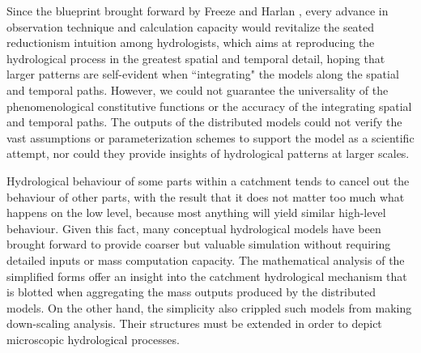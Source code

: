 \documentclass[11pt]{article}
\begin{document}

 

Since the blueprint brought forward by Freeze and Harlan  \cite{freeze1969blueprint}, 
 every advance in observation technique and calculation capacity would revitalize the seated reductionism intuition among hydrologists, which aims at reproducing the hydrological process in the greatest spatial and temporal detail, hoping that larger patterns are self-evident when ``integrating" the models along the spatial and temporal paths. However, we could not guarantee the universality of the phenomenological constitutive functions or the accuracy of the integrating spatial and temporal paths. The outputs of the distributed models could not verify the vast assumptions or parameterization schemes to support the model as a scientific attempt, nor could they provide insights of hydrological patterns at larger scales.  


Hydrological behaviour of some parts within a catchment tends to cancel out the behaviour of other parts, with the result that it does not matter too much what happens on the low level, because most anything will yield similar high-level behaviour\cite{hofstadter1980godel}. Given this fact, many conceptual hydrological models have been brought forward to provide  coarser but valuable simulation without requiring detailed inputs or mass computation capacity. The mathematical analysis of the simplified forms offer an insight into the catchment hydrological mechanism that is blotted when aggregating the mass outputs produced by the distributed models\cite{gerrits2009analytical,xu2014attribution}. On the other hand, the simplicity also crippled such models from making down-scaling analysis. Their structures must be extended in order to depict microscopic hydrological processes.
 
\end{document}
